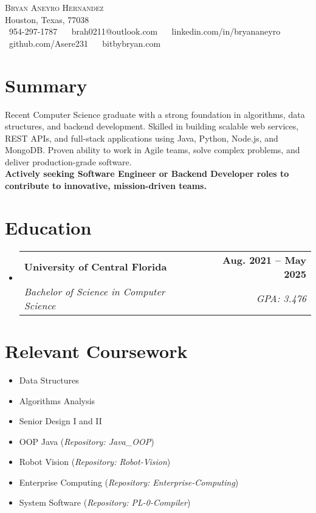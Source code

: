 \documentclass[letterpaper,11pt]{article}
\makeatletter
\newcommand{\resumeSubheading}[4]{
  \vspace{-2pt}\item
    \begin{tabular*}{1.0\textwidth}[t]{l@{\extracolsep{\fill}}r}
      \textbf{#1} & \textbf{\small #2} \\
      \textit{\small#3} & \textit{\small #4} \\
    \end{tabular*}\vspace{-7pt}
}
\newcommand{\resumeSubHeadingListStart}{\begin{itemize}[leftmargin=0.0in, label={}]}
\newcommand{\resumeSubHeadingListEnd}{\end{itemize}}
\makeatother
\begin{document}
\scriptsize

\begin{center}
    {\Huge \scshape Bryan Aneyro Hernandez} \\ \vspace{1pt}
    Houston, Texas, 77038 \\ \vspace{1pt}
    \small \raisebox{-0.1\height}\faPhone\ 954-297-1787 ~ 
    \small \raisebox{-0.2\height}\faEnvelope\ brah0211@outlook.com ~ 
     \small \raisebox{-0.2\height}\faLinkedin\ linkedin.com/in/bryananeyro ~
    \small \raisebox{-0.2\height}\faGithub\ github.com/Asere231 ~
    \small \raisebox{-0.2\height}\faGlobe\ bitbybryan.com
    \vspace{-8pt}
\end{center}

\section{Summary}
\small{
Recent Computer Science graduate with a strong foundation in algorithms, data structures, and backend development. Skilled in building scalable web services, REST APIs, and full-stack applications using Java, Python, Node.js, and MongoDB. Proven ability to work in Agile teams, solve complex problems, and deliver production-grade software.\\
\textbf{Actively seeking Software Engineer or Backend Developer roles to contribute to innovative, mission-driven teams.}
}

\section{Education}
\resumeSubHeadingListStart
  \resumeSubheading
    {University of Central Florida}{Aug. 2021 -- May 2025}
    {Bachelor of Science in Computer Science}{GPA: 3.476}
\resumeSubHeadingListEnd

\section{Relevant Coursework}
\begin{multicols}{2}
    \begin{itemize}[itemsep=-5pt, parsep=3pt]
        \item Data Structures
        \item Algorithms Analysis
        \item Senior Design I and II
        \item OOP Java (\emph{Repository: Java\_OOP})
        \item Robot Vision (\emph{Repository: Robot-Vision})
        \item Enterprise Computing (\emph{Repository: Enterprise-Computing})
        \item System Software (\emph{Repository: PL-0-Compiler})
    \end{itemize}
\end{multicols}
\vspace*{2.0\multicolsep}
\end{document}
